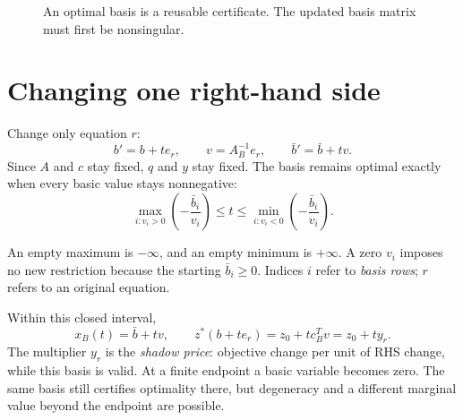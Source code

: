 \documentclass[11pt,a4paper]{article}
\begin{document}
\begin{figure}[H]\centering
  \caption{An optimal basis is a reusable certificate. The updated basis matrix
    must first be nonsingular.}\label{fig:certificate}
\end{figure}

\section{Changing one right-hand side}\label{sec:rhs}
\begin{lecturecore}
  Change only equation $r$:
  \[
    b'=b+t e_r,\qquad v=A_B^{-1}e_r,\qquad \bar b'=\bar b+t v.
  \]
  Since $A$ and $c$ stay fixed, $q$ and $y$ stay fixed. The basis remains optimal
  exactly when every basic value stays nonnegative:
  \begin{equation}\label{eq:rhs-interval}
    \max_{i:v_i>0}\left(-\frac{\bar b_i}{v_i}\right)
    \leq t\leq
    \min_{i:v_i<0}\left(-\frac{\bar b_i}{v_i}\right).
  \end{equation}
\end{lecturecore}
An empty maximum is $-\infty$, and an empty minimum is $+\infty$.
A zero $v_i$ imposes no new restriction because the starting $\bar b_i\geq0$.
Indices $i$ refer to \emph{basis rows}; $r$ refers to an original equation.

Within this closed interval,
\begin{equation}\label{eq:shadow}
  x_B(t)=\bar b+t v,\qquad
  z^*(b+t e_r)=z_0+t c_B^Tv=z_0+t y_r.
\end{equation}
The multiplier $y_r$ is the \emph{shadow price}: objective change per unit of
RHS change, while this basis is valid. At a finite endpoint a basic variable
becomes zero. The same basis still certifies optimality there, but degeneracy
and a different marginal value beyond the endpoint are possible.
\end{document}
